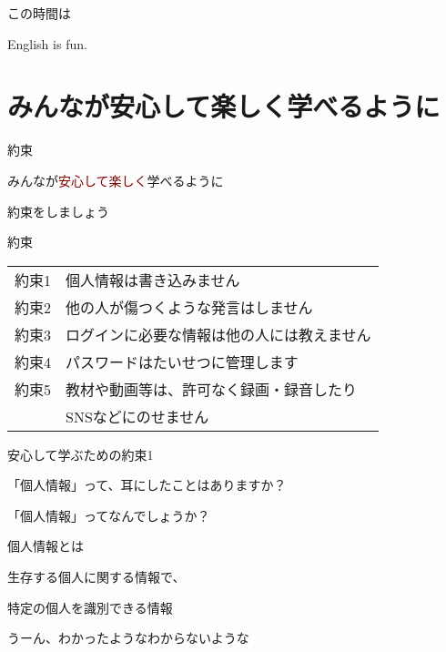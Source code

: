 \documentclass[
  ignorenonframetext,
  aspectratio=169,
  xcolor=dvipsnames]{beamer}
\begin{document}
\begin{frame}{この時間は}
\label{ux3053ux306eux6642ux9593ux306f}
\Huge

\centering

English is fun.
\end{frame}

\section{みんなが安心して楽しく学べるように}\label{ux307fux3093ux306aux304cux5b89ux5fc3ux3057ux3066ux697dux3057ux304fux5b66ux3079ux308bux3088ux3046ux306b}

\begin{frame}{約束}
\label{ux7d04ux675f}
\LARGE

みんなが\textcolor{Maroon}{安心して楽しく}学べるように

\pause

約束をしましょう
\end{frame}

\begin{frame}{約束}
\label{ux7d04ux675f-1}
\Large

\begin{tabular}{ll}
約束1& 個人情報は書き込みません\\\pause
約束2& 他の人が傷つくような発言はしません\\\pause
約束3& ログインに必要な情報は他の人には教えません\\\pause
約束4& パスワードはたいせつに管理します\\\pause
約束5& 教材や動画等は、許可なく録画・録音したり\\
&      SNSなどにのせません
\end{tabular}
\end{frame}

\begin{frame}{安心して学ぶための約束1}
\label{ux5b89ux5fc3ux3057ux3066ux5b66ux3076ux305fux3081ux306eux7d04ux675f1}
\LARGE

\pause

「個人情報」って、耳にしたことはありますか？

\pause

「個人情報」ってなんでしょうか？
\end{frame}

\begin{frame}{個人情報とは}
\label{ux500bux4ebaux60c5ux5831ux3068ux306f}
\LARGE

生存する個人に関する情報で、

特定の個人を識別できる情報

\vfill
\pause

うーん、わかったようなわからないような
\end{frame}
\end{document}
